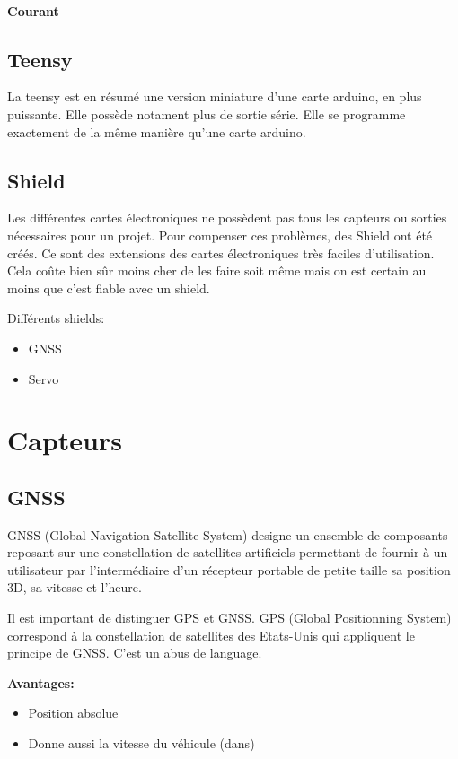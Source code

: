 \documentclass[a4paper, 11pt]{report}
\begin{document}
\subsubsection{Courant}

\section{Teensy}
La teensy est en résumé une version miniature d'une carte arduino, en plus puissante. Elle possède notament plus de sortie série. Elle se programme exactement de la même manière qu'une carte arduino.

\section{Shield}
Les différentes cartes électroniques ne possèdent pas tous les capteurs ou sorties nécessaires pour un projet. Pour compenser ces problèmes, des Shield ont été créés. Ce sont des extensions des cartes électroniques très faciles d'utilisation. Cela coûte bien sûr moins cher de les faire soit même mais on est certain au moins que c'est fiable avec un shield.

Différents shields:
\begin{itemize}
\item GNSS
\item Servo
\end{itemize}

\chapter{Capteurs}

\section{GNSS}
GNSS (Global Navigation Satellite System)  designe un ensemble de composants reposant sur une constellation de satellites artificiels permettant de fournir à un utilisateur par l’intermédiaire d'un récepteur portable de petite taille sa position 3D, sa vitesse et l'heure.

Il est important de distinguer GPS et GNSS. GPS (Global Positionning System) correspond à la constellation de satellites des Etats-Unis qui appliquent le principe de GNSS. C'est un abus de language.

\textbf{Avantages:}
\begin{itemize}
\item Position absolue
\item Donne aussi la vitesse du véhicule (dans)
\end{itemize}
\end{document}
